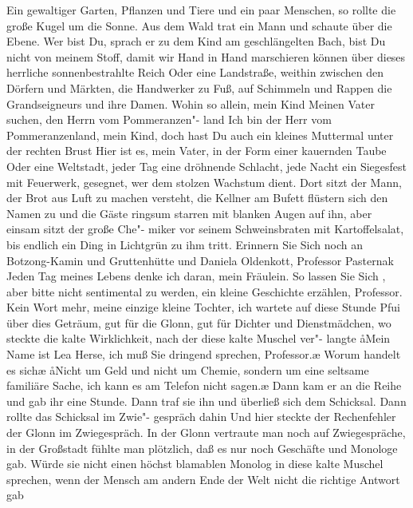 Ein gewaltiger Garten, Pflanzen und Tiere und ein paar
Menschen, so rollte die große Kugel um die Sonne. Aus dem
Wald trat ein Mann und schaute über die Ebene. Wer bist
Du, sprach er zu dem Kind am geschlängelten Bach, bist Du
nicht von meinem Stoff, damit wir Hand in Hand marschieren
können über dieses herrliche sonnenbestrahlte Reich\punkte{}%
\eingriff{eS44-1}{Reich\punkte{} ] Reich~\punkte{}}
Oder eine Landstraße, weithin zwischen den Dörfern und
Märkten, die Handwerker zu Fuß, auf Schimmeln und Rappen
die Grandseigneurs und ihre Damen. Wohin so allein, mein
Kind\frag{} Meinen Vater suchen, den Herrn vom Pommeranzen"-%
land\ausr{} Ich bin der Herr vom Pommeranzenland, mein Kind,
doch hast Du auch ein kleines Muttermal unter der rechten
Brust\frag{} Hier ist es, mein Vater, in der Form einer kauernden
Taube\punkte{} Oder eine Weltstadt, jeder Tag eine dröhnende
Schlacht, jede Nacht ein Siegesfest mit Feuerwerk, gesegnet,
wer dem stolzen Wachstum dient. Dort sitzt der Mann, der
Brot aus Luft zu machen versteht, die Kellner am Bufett
flüstern sich den Namen zu und die Gäste ringsum starren
mit blanken Augen auf ihn, aber einsam sitzt der große Che"-%
miker vor seinem Schweinsbraten mit Kartoffelsalat, bis
endlich ein Ding in Lichtgrün zu ihm tritt. Erinnern Sie Sich%
\eingriff{eS44-2}{Sich ] sich}
noch an Botzong-Kamin und Gruttenhütte und Daniela
Oldenkott, Professor Pasternak\frag{} Jeden Tag meines Lebens
denke ich daran, mein Fräulein. So lassen Sie Sich%
\eingriff{eS45-1}{Sich ] sich}%
, aber bitte
nicht sentimental zu werden, ein kleine Geschichte erzählen,
Professor. Kein Wort mehr, meine einzige kleine Tochter,
ich wartete auf diese Stunde\punkte{} Pfui über dies Geträum,
gut für die Glonn, gut für Dichter und Dienstmädchen, wo
steckte die kalte Wirklichkeit, nach der diese kalte Muschel ver"-%
langte\frag{} \aa{}Mein Name ist Lea Herse, ich muß Sie dringend
sprechen, Professor.\ae{} \aanah{}Worum handelt es sich\frag{}\ae{} \aa{}Nicht
um Geld und nicht um Chemie, sondern um eine seltsame familiäre
Sache, ich kann es am Telefon nicht sagen.\ae{} Dann kam er an
die Reihe und gab ihr eine Stunde. Dann traf sie ihn und
überließ sich dem Schicksal. Dann rollte das Schicksal im Zwie"-%
gespräch dahin\punkte{}%
\eingriff{eS45-2}{dahin\punkte{} ] dahin \punkte{}}
Und hier
steckte der Rechenfehler der Glonn\dopp{} im Zwiegespräch. In der Glonn vertraute man noch
auf Zwiegespräche, in der Großstadt fühlte man plötzlich,
daß es nur noch Geschäfte und Monologe gab. Würde sie
nicht einen höchst blamablen Monolog in diese kalte Muschel
sprechen, wenn der Mensch am andern Ende der Welt nicht
die richtige Antwort gab\frag{}

